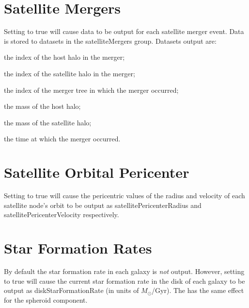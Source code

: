 \section{Satellite Mergers}

Setting {\normalfont \ttfamily [outputSatelliteMergers]} to {\normalfont \ttfamily true} will cause data to be output for each satellite merger event. Data is stored to datasets in the {\normalfont \ttfamily satelliteMergers} group. Datasets output are:
\begin{description}
\item{\normalfont \ttfamily [indexHost]} the index of the host halo in the merger;
\item{\normalfont \ttfamily [indexSatellite]} the index of the satellite halo in the merger;
\item{\normalfont \ttfamily [indexTree]} the index of the merger tree in which the merger occurred;
\item{\normalfont \ttfamily [massHost]} the mass of the host halo;
\item{\normalfont \ttfamily [massSatellite]} the mass of the satellite halo;
\item{\normalfont \ttfamily [time]} the time at which the merger occurred.
\end{description}

\section{Satellite Orbital Pericenter}

Setting {\normalfont \ttfamily [outputSatellitePericenterData]} to {\normalfont \ttfamily true} will cause the pericentric values of the radius and velocity of each satellite node's orbit to be output as {\normalfont \ttfamily satellitePericenterRadius} and {\normalfont \ttfamily satellitePericenterVelocity} respectively.

\section{Star Formation Rates}

By default the star formation rate in each galaxy is \emph{not} output. However, setting {\normalfont \ttfamily [diskOutputStarFormationRate]} to true will cause the current star formation rate in the disk of each galaxy to be output as {\normalfont \ttfamily diskStarFormationRate} (in units of $M_\odot$/Gyr). The {\normalfont \ttfamily [spheroidOutputStarFormationRate]} has the same effect for the spheroid component.

